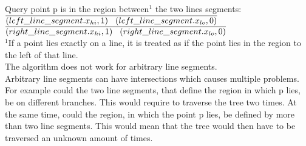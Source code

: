 \documentclass[english, fontsize=12pt, paper=a4, twoside=false, open=right, draft=true, pagesize=auto, version=last, DIV=16]{scrartcl}
\theoremstyle{break}
\begin{document}
Query point p is in the region between$^1$ the two lines segments:\\
$\overline{(left\_line\_segment.x_{hi}, 1)\hspace*{3mm}(left\_line\_segment.x_{lo}, 0)}$\\
$\overline{(right\_line\_segment.x_{hi}, 1)\hspace*{3mm}(right\_line\_segment.x_{lo}, 0)}$\\

$^1$If a point lies exactly on a line, it is treated as if the point lies in the region to the left of that line.\\

The algorithm does not work for arbitrary line segments.\\
Arbitrary line segments can have intersections which causes multiple problems. For example could the two line segments, that define the region in which p lies, be on different branches. This would require to traverse the tree two times. At the same time, could the region, in which the point p lies, be defined by more than two line segments. This would mean that the tree would then have to be traversed an unknown amount of times.
\newpage
\end{document}
